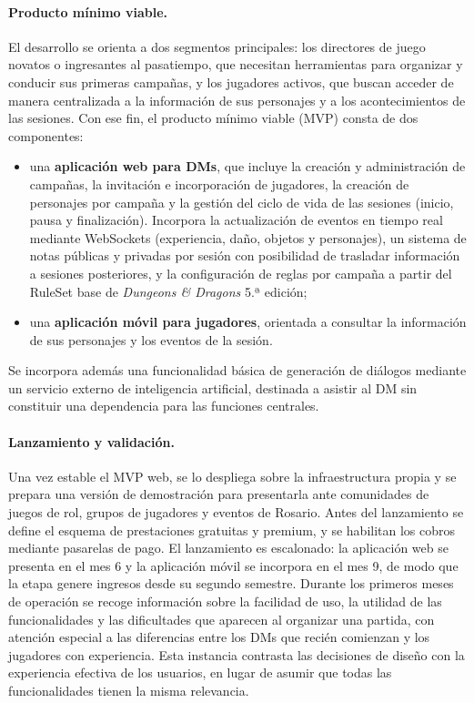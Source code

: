 \paragraph{Producto mínimo viable.}
El desarrollo se orienta a dos segmentos principales: los directores de juego novatos o ingresantes al pasatiempo, que necesitan herramientas para organizar y conducir sus primeras campañas, y los jugadores activos, que buscan acceder de manera centralizada a la información de sus personajes y a los acontecimientos de las sesiones. Con ese fin, el producto mínimo viable (MVP) consta de dos componentes:
\begin{itemize}
  \item una \textbf{aplicación web para DMs}, que incluye la creación y administración de campañas, la invitación e incorporación de jugadores, la creación de personajes por campaña y la gestión del ciclo de vida de las sesiones (inicio, pausa y finalización). Incorpora la actualización de eventos en tiempo real mediante WebSockets (experiencia, daño, objetos y personajes), un sistema de notas públicas y privadas por sesión con posibilidad de trasladar información a sesiones posteriores, y la configuración de reglas por campaña a partir del RuleSet base de \textit{Dungeons \& Dragons} 5.ª edición;
  \item una \textbf{aplicación móvil para jugadores}, orientada a consultar la información de sus personajes y los eventos de la sesión.
\end{itemize}
Se incorpora además una funcionalidad básica de generación de diálogos mediante un servicio externo de inteligencia artificial, destinada a asistir al DM sin constituir una dependencia para las funciones centrales.

\paragraph{Lanzamiento y validación.}
Una vez estable el MVP web, se lo despliega sobre la infraestructura propia y se prepara una versión de demostración para presentarla ante comunidades de juegos de rol, grupos de jugadores y eventos de Rosario. Antes del lanzamiento se define el esquema de prestaciones gratuitas y premium, y se habilitan los cobros mediante pasarelas de pago. El lanzamiento es escalonado: la aplicación web se presenta en el mes 6 y la aplicación móvil se incorpora en el mes 9, de modo que la etapa genere ingresos desde su segundo semestre. Durante los primeros meses de operación se recoge información sobre la facilidad de uso, la utilidad de las funcionalidades y las dificultades que aparecen al organizar una partida, con atención especial a las diferencias entre los DMs que recién comienzan y los jugadores con experiencia. Esta instancia contrasta las decisiones de diseño con la experiencia efectiva de los usuarios, en lugar de asumir que todas las funcionalidades tienen la misma relevancia.

